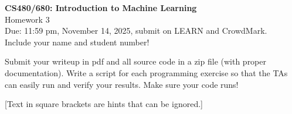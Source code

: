 \documentclass[10pt,letter,notitlepage]{article}
\newcounter{exercise}
\begin{document}
\begin{center}
\large{\textbf{CS480/680: Introduction to Machine Learning} \\ Homework 3\\ Due: 11:59 pm, November 14, 2025, submit on LEARN and CrowdMark.} \\

Include your name and student number!

\end{center}

\begin{center}
Submit your writeup in pdf and all source code in a zip file (with proper documentation). Write a script for each programming exercise so that the TAs can easily run and verify your results. Make sure your code runs!

[Text in square brackets are hints that can be ignored.]
\end{center}
\end{document}
